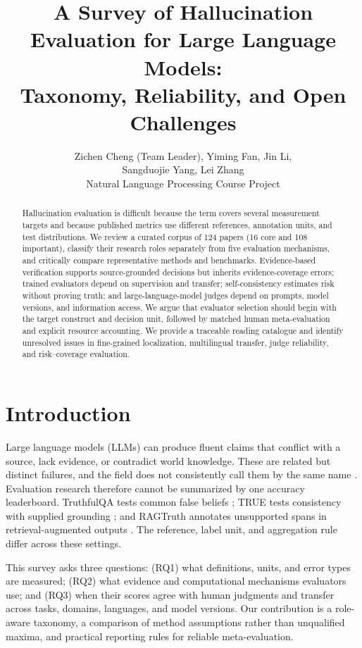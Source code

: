 \documentclass[11pt]{article}
\title{A Survey of Hallucination Evaluation for Large Language Models:\\Taxonomy, Reliability, and Open Challenges}
\author{Zichen Cheng (Team Leader), Yiming Fan, Jin Li,\\ Sangduojie Yang, Lei Zhang\\Natural Language Processing Course Project}
\begin{document}
\maketitle
\begin{abstract}
Hallucination evaluation is difficult because the term covers several measurement targets and because published metrics use different references, annotation units, and test distributions. We review a curated corpus of 124 papers (16 core and 108 important), classify their research roles separately from five evaluation mechanisms, and critically compare representative methods and benchmarks. Evidence-based verification supports source-grounded decisions but inherits evidence-coverage errors; trained evaluators depend on supervision and transfer; self-consistency estimates risk without proving truth; and large-language-model judges depend on prompts, model versions, and information access. We argue that evaluator selection should begin with the target construct and decision unit, followed by matched human meta-evaluation and explicit resource accounting. We provide a traceable reading catalogue and identify unresolved issues in fine-grained localization, multilingual transfer, judge reliability, and risk--coverage evaluation.
\end{abstract}

\section{Introduction}
Large language models (LLMs) can produce fluent claims that conflict with a source, lack evidence, or contradict world knowledge. These are related but distinct failures, and the field does not consistently call them by the same name \citep{C01,C02,C16}. Evaluation research therefore cannot be summarized by one accuracy leaderboard. TruthfulQA tests common false beliefs \citep{C05}; TRUE tests consistency with supplied grounding \citep{C11}; and RAGTruth annotates unsupported spans in retrieval-augmented outputs \citep{C12}. The reference, label unit, and aggregation rule differ across these settings.

This survey asks three questions: (RQ1) what definitions, units, and error types are measured; (RQ2) what evidence and computational mechanisms evaluators use; and (RQ3) when their scores agree with human judgments and transfer across tasks, domains, languages, and model versions. Our contribution is a role-aware taxonomy, a comparison of method assumptions rather than unqualified maxima, and practical reporting rules for reliable meta-evaluation.
\end{document}
